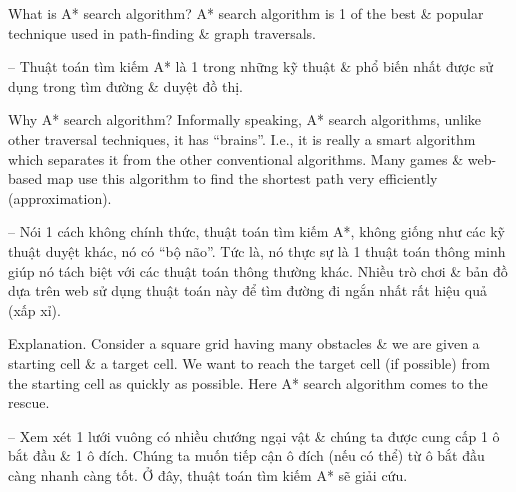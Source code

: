 \documentclass{article}
\begin{document}
{\sf What is A* search algorithm?} A* search algorithm is 1 of the best \& popular technique used in path-finding \& graph traversals.

-- Thuật toán tìm kiếm A* là 1 trong những kỹ thuật \& phổ biến nhất được sử dụng trong tìm đường \& duyệt đồ thị.

{\sf Why A* search algorithm?} Informally speaking, A* search algorithms, unlike other traversal techniques, it has ``brains''. I.e., it is really a smart algorithm which separates it from the other conventional algorithms. Many games \& web-based map use this algorithm to find the shortest path very efficiently (approximation).

-- Nói 1 cách không chính thức, thuật toán tìm kiếm A*, không giống như các kỹ thuật duyệt khác, nó có ``bộ não''. Tức là, nó thực sự là 1 thuật toán thông minh giúp nó tách biệt với các thuật toán thông thường khác. Nhiều trò chơi \& bản đồ dựa trên web sử dụng thuật toán này để tìm đường đi ngắn nhất rất hiệu quả (xấp xỉ).

{\sf Explanation.} Consider a square grid having many obstacles \& we are given a starting cell \& a target cell. We want to reach the target cell (if possible) from the starting cell as quickly as possible. Here A* search algorithm comes to the rescue.

-- Xem xét 1 lưới vuông có nhiều chướng ngại vật \& chúng ta được cung cấp 1 ô bắt đầu \& 1 ô đích. Chúng ta muốn tiếp cận ô đích (nếu có thể) từ ô bắt đầu càng nhanh càng tốt. Ở đây, thuật toán tìm kiếm A* sẽ giải cứu.
\end{document}
